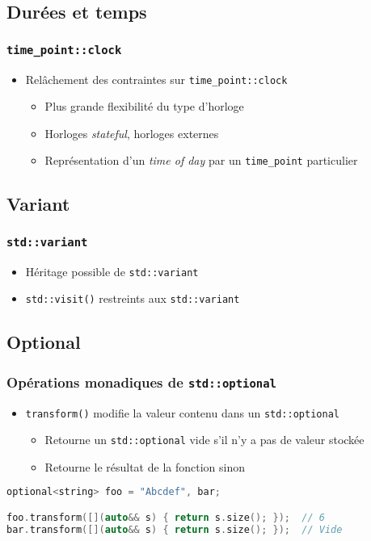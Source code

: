 \documentclass[C++.tex]{subfiles}
\begin{document}
\subsection*{Durées et temps}
\begin{frame}[fragile]
	\frametitle{\lstinline|time_point::clock|}
	\begin{itemize}
		\item Relâchement des contraintes sur \lstinline|time_point::clock|
		\begin{itemize}
			\item Plus grande flexibilité du type d'horloge
			\item Horloges \textit{stateful}, horloges externes
			\item Représentation d'un \textit{time of day} par un \lstinline|time_point| particulier
		\end{itemize}
	\end{itemize}
\end{frame}

\subsection*{Variant}
\begin{frame}[fragile]
	\frametitle{\lstinline|std::variant|}
	\begin{itemize}
		\item Héritage possible de \lstinline|std::variant|
		\item \lstinline|std::visit()| restreints aux \lstinline|std::variant|

	\end{itemize}
\end{frame}

\subsection*{Optional}
\begin{frame}[fragile]
	\frametitle{Opérations monadiques de \lstinline|std::optional|}
	\begin{itemize}
		\item \lstinline|transform()| modifie la valeur contenu dans un \lstinline|std::optional|


		\begin{itemize}
			\item Retourne un \lstinline|std::optional| vide s'il n'y a pas de valeur stockée
			\item Retourne le résultat de la fonction sinon
		\end{itemize}
	\end{itemize}

	\begin{lstlisting}[language=C++]
optional<string> foo = "Abcdef", bar;

foo.transform([](auto&& s) { return s.size(); });  // 6
bar.transform([](auto&& s) { return s.size(); });  // Vide\end{lstlisting}
\end{frame}
\end{document}
